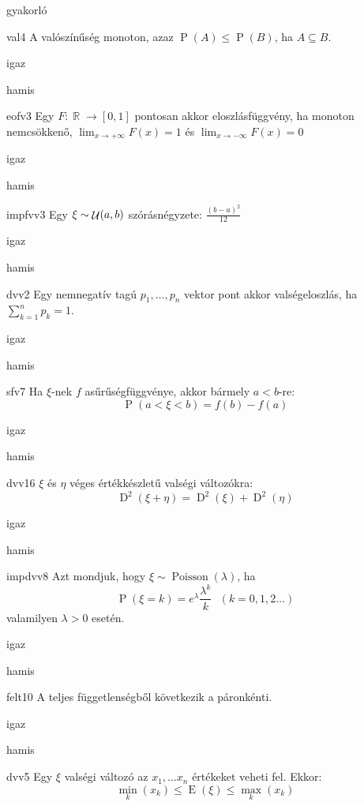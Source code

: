 \documentclass[12pt]{article}
\DeclareMathOperator{\E}{E}
\DeclareMathOperator{\D}{D}
\renewcommand{\P}{\operatorname{P}}
\DeclareMathOperator{\R}{\mathbb{R}}
\DeclareMathOperator{\Unif}{{\cal U}}
\DeclareMathOperator{\Poi}{{Poisson}}
\begin{document}
\begin{quiz}{gyakorló}
\begin{multi}{val4}
A valószínűség monoton, azaz $\P(A)\le \P(B)$, ha $A\subseteq B$.
\item* igaz
\item hamis
\end{multi}
\begin{multi}{eofv3}
Egy $F:\R\to [0,1]$ pontosan akkor eloszlásfüggvény, ha monoton nemcsökkenő, 
$\lim_{x\to+\infty}F(x)=1$ és $\lim_{x\to-\infty}F(x)=0$
\item igaz
\item* hamis
\end{multi}
\begin{multi}{impfvv3}
Egy $\xi\sim \Unif(a,b)$ szórásnégyzete: $\frac{(b-a)^2}{12}$
\item* igaz
\item hamis
\end{multi}
\begin{multi}{dvv2}
Egy nemnegatív tagú $p_1,\ldots, p_n$ vektor pont akkor valségeloszlás, ha $\sum_{k=1}^n p_k=1$.
\item* igaz
\item hamis
\end{multi}
\begin{multi}{sfv7}
Ha $\xi$-nek $f$ asűrűségfüggvénye, akkor bármely $a<b$-re:
$$
\P(a<\xi<b)=f(b)-f(a)
$$
\item igaz
\item* hamis
\end{multi}
\begin{multi}{dvv16}
$\xi$ és $\eta$ véges értékkészletű valségi változókra:
$$
\D^2(\xi+\eta)=\D^2(\xi)+\D^2(\eta)
$$
\item igaz
\item* hamis
\end{multi}
\begin{multi}{impdvv8}
Azt mondjuk, hogy $\xi\sim \Poi(\lambda)$, ha 
$$
\P(\xi=k)=e^{\lambda}\frac{\lambda^k}{k}\ \ \ (k=0,1,2\ldots )
$$ 
valamilyen $\lambda>0$ esetén.
\item igaz
\item* hamis
\end{multi}
\begin{multi}{felt10}
A teljes függetlenségből következik a páronkénti.
\item* igaz
\item hamis
\end{multi}
\begin{multi}{dvv5}
Egy $\xi$ valségi változó az $x_1,\ldots x_n$ értékeket veheti fel. Ekkor:
$$
\min_k(x_k)\le \E(\xi) \le \max_k(x_k)
$$

\end{multi}
\end{quiz}
\end{document}
